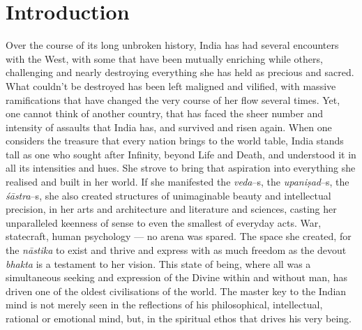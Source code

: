 \section*{Introduction}

Over the course of its long unbroken history, India has had several encounters with the West, with some that have been mutually enriching while others, challenging and nearly destroying everything she has held as precious and sacred. What couldn’t be destroyed has been left maligned and vilified, with massive ramifications that have changed the very course of her flow several times. Yet, one cannot think of another country, that has faced the sheer number and intensity of assaults that India has, and survived and risen again. When one considers the treasure that every nation brings to the world table, India stands tall as one who sought after Infinity, beyond Life and Death, and understood it in all its intensities and hues. She strove to bring that aspiration into everything she realised and built in her world. If she manifested the \textit{veda}–s, the \textit{upaniṣad}–s, the \textit{śāstra}–s, she also created structures of unimaginable beauty and intellectual precision, in her arts and architecture and literature and sciences, casting her unparalleled keenness of sense to even the smallest of everyday acts. War, statecraft, human psychology — no arena was spared. The space she created, for the \textit{nāstika} to exist and thrive and express with as much freedom as the devout \textit{bhakta} is a testament to her vision. This state of being, where all was a simultaneous seeking and expression of the Divine within and without man, has driven one of the oldest civilisations of the world. The master key to the Indian mind is not merely seen in the reflections of his philosophical, intellectual, rational or emotional mind, but, in the spiritual ethos that drives his very being.

